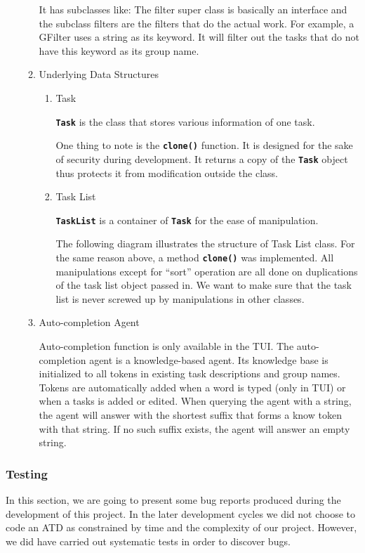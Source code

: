 \documentclass[12pt, a4paper]{article}
\newcommand{\cmdinline}[1]{{\bf \texttt{#1}}}
\begin{document}
\begin{enumerate}
\begin{enumerate}
It has subclasses like: 
The filter super class is basically an interface and the subclass filters are the filters that do the
actual work. For example, a GFilter uses a string as its keyword. It will filter out the tasks that
do not have this keyword as its group name.

\item Underlying Data Structures
\begin{enumerate}
\item Task

\cmdinline{Task} is the class that stores various information of one task.

One thing to note is the \cmdinline{clone()} function. It is designed for the
sake of security during development. It returns a copy of the \cmdinline{Task} object thus protects it from modification outside the class.

\item Task List

\cmdinline{TaskList} is a container of \cmdinline{Task} for the ease of manipulation.

The following diagram illustrates the structure of Task List class.
For the same reason above, a method \cmdinline{clone()} was implemented. All manipulations except for ``sort'' operation
are all done on duplications of the task list object passed in. We want to make sure that the task list is never screwed up by manipulations in other classes.
\end{enumerate}

\item Auto-completion Agent

Auto-completion function is only available in the TUI. The auto-completion agent is a knowledge-based agent.
Its knowledge base is initialized to all tokens in existing task descriptions and group names.
Tokens are automatically added when a word is typed (only in TUI) or when a tasks is added
or edited. When querying the agent with a string, the agent will answer with the
shortest suffix that forms a know token with that string. If no such suffix
exists, the agent will answer an empty string.

\end{enumerate}
\end{enumerate}


\subsubsection{Testing}
In this section, we are going to present some bug reports produced during the development of
this project. In the later development cycles we did not choose to code an ATD as constrained by time and the complexity of
our project. However, we did have carried out systematic tests in order to discover bugs.
\end{document}
